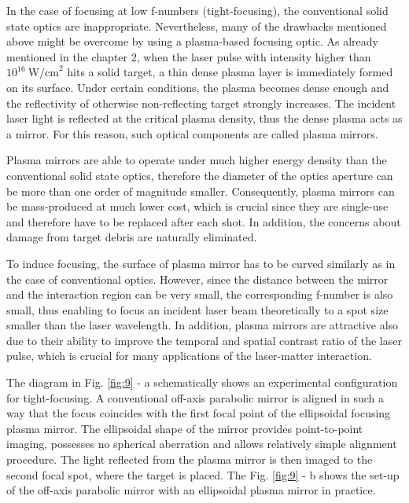 In the case of focusing at low f-numbers (tight-focusing), the conventional solid state optics are inappropriate. Nevertheless, many of the drawbacks mentioned above might be overcome by using a plasma-based focusing optic. As already mentioned in the chapter 2, when the laser pulse with intensity higher than $ 10^{16} \ \mathrm{W/cm}^{2} $ hits a solid target, a thin dense plasma layer is immediately formed on its surface. Under certain conditions, the plasma becomes dense enough and the reflectivity of otherwise non-reflecting target strongly increases. The incident laser light is reflected at the critical plasma density, thus the dense plasma acts as a mirror. For this reason, such optical components are called plasma mirrors.

Plasma mirrors are able to operate under much higher energy density than the conventional solid state optics, therefore the diameter of the optics aperture can be more than one order of magnitude smaller. Consequently, plasma mirrors can be mass-produced at much lower cost, which is crucial since they are single-use and therefore have to be replaced after each shot. In addition, the concerns about damage from target debris are naturally eliminated.

To induce focusing, the surface of plasma mirror has to be curved similarly as in the case of conventional optics. However, since the distance between the mirror and the interaction region can be very small, the corresponding f-number is also small, thus enabling to focus an incident laser beam theoretically to a spot size smaller than the laser wavelength. In addition, plasma mirrors are attractive also due to their ability to improve the temporal and spatial contrast ratio of the laser pulse, which is crucial for many applications of the laser-matter interaction.

The diagram in Fig. \ref{fig:9} - a schematically shows an experimental configuration for tight-focusing. A conventional off-axis parabolic mirror is aligned in such a way that the focus coincides with the first focal point of the ellipsoidal focusing plasma mirror. The ellipsoidal shape of the mirror provides point-to-point imaging, possesses no spherical aberration and allows relatively simple alignment procedure. The light reflected from the plasma mirror is then imaged to the second focal spot, where the target is placed. The Fig. \ref{fig:9} - b shows the set-up of the off-axis parabolic mirror with an ellipsoidal plasma mirror in practice.